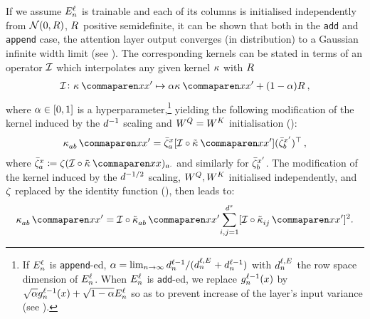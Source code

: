 \documentclass{article}
\begin{document}
If we assume $E_{n}^{\ell}$ is trainable and each of its columns is initialised independently from $\mathcal{N} (0 , R)$,
$R_{}^{}$ positive semidefinite,
it can be shown that both in the \texttt{add} and \texttt{append} case, the attention layer output converges (in distribution) to a Gaussian infinite width limit (see ).
The corresponding kernels can be stated in terms of an operator $\mathcal{I}$ which interpolates any given kernel $\kappa$ with $R_{}^{}$
\begin{align}\label{eq:kernel_interp_op}
    \interpKern
    \colon
    \kernelf{}{}{\inputSymbol}{\inputSymbol'}
    \mapsto
    \interpKernCoeff \kernelf{}{}{\inputSymbol}{\inputSymbol'}
    +
    (1 - \interpKernCoeff)
    \covPosEmb{}{}
    \, ,
\end{align}
where $\alpha \in [0, 1]$ is a hyperparameter,\footnote{If $E_{n}^{\ell}$ is \texttt{append}-ed, $\alpha = \lim_{n \to \infty} d_{n}^{\ell - 1} / (d_{n}^{\ell, E_{}^{}} + d_{n}^{\ell - 1})$ with $d_{n}^{\ell, E_{}^{}}$ the row space dimension of $E_{n}^{\ell}$.
When $E_{n}^{\ell}$ is \texttt{add}-ed, we replace ${g}^{\ell - 1}_{n}{(x)}$ by 
$\sqrt{\alpha} {g}^{\ell - 1}_{n}{(x)} + \sqrt{1 - \alpha} E_{n}^{\ell}$ 
so as to prevent increase of the layer's input variance (see ).} yielding the following modification of the kernel induced by the $d^{-1}$ scaling and $W^{Q} = W^{K}$ initialisation ():
\begin{align}\label{eq:sum_pe_lin_scale_kernel}
    \kernelf{a b}{}{\inputSymbol}{\inputSymbol'}
    =
    \softmaxMean_{a}^{\inputSymbol}
    [
        \interpKern \circ
        \kerntildef{}{}{\inputSymbol}{\inputSymbol'}
    ]
    (\softmaxMean_{b}^{\inputSymbol'})^\top
    \, ,
\end{align}
where 
$
    \softmaxMean_{a}^{\inputSymbol}
    \coloneqq
    \softmax (
        \interpKern \circ
        \kerntildef{}{}{\inputSymbol}{\inputSymbol}
    )_{a \cdot}
$
and similarly for $\bar{\zeta}_{b}^{x'}$.
The modification of the kernel induced by the $d^{-1/2}$ scaling, $W^{Q}, W^{K}$ initialised independently, and $\zeta$ replaced by the identity function (), then leads to:
\begin{align}\label{eq:sum_pe_sqrt_scale_kernel}
    \kernelf{a b}{}{\inputSymbol}{\inputSymbol'}
    =
    \interpKern \circ
    \kerntildef{a b}{}{\inputSymbol}{\inputSymbol'}
    \!
    \sum_{i, j=1}^{\spatialDimension}
         [
            \interpKern \circ
            \kerntildef{i j}{}{\inputSymbol}{\inputSymbol'}
         ]^2
    .
\end{align}
\end{document}
